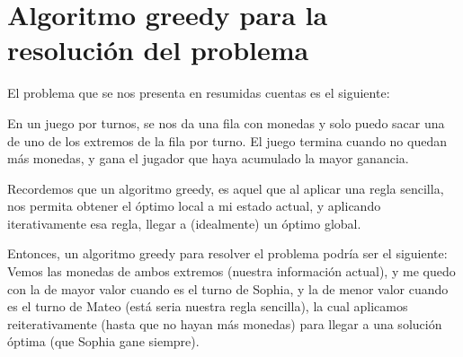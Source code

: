 \section{Algoritmo greedy para la resolución del problema}

El problema que se nos presenta en resumidas cuentas es el siguiente:

En un juego por turnos, se nos da una fila con monedas y solo puedo sacar una de uno de los extremos de la fila por turno. El juego termina cuando no quedan más monedas, y gana el jugador que haya acumulado la mayor ganancia.

Recordemos que un algoritmo greedy, es aquel que al aplicar una regla sencilla, nos permita obtener el óptimo local a mi estado actual, y aplicando iterativamente esa regla, llegar a (idealmente) un óptimo global.

Entonces, un algoritmo greedy para resolver el problema podría ser el siguiente: Vemos las monedas de ambos extremos (nuestra información actual), y me quedo con la de mayor valor cuando es el turno de Sophia, y la de menor valor cuando es el turno de Mateo (está seria nuestra regla sencilla), la cual aplicamos reiterativamente (hasta que no hayan más monedas) para llegar a una solución óptima (que Sophia gane siempre).